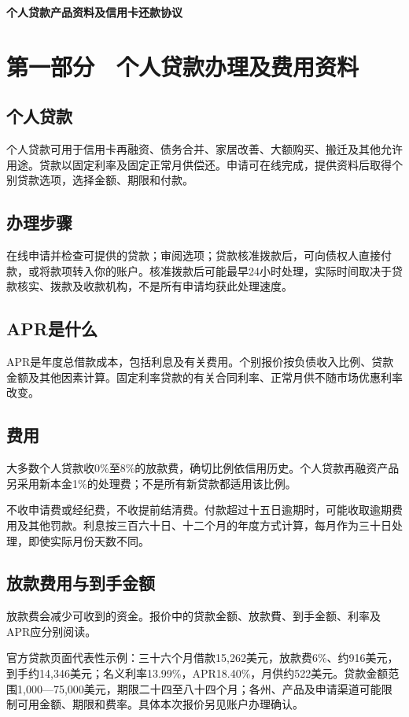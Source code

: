 \documentclass[UTF8,fontset=none,11pt,a4paper]{ctexart}
\begin{document}
{\noindent\LARGE\bfseries 个人贷款产品资料及信用卡还款协议\par}
\vspace{10pt}
\section*{第一部分　个人贷款办理及费用资料}
\subsection*{个人贷款}
个人贷款可用于信用卡再融资、债务合并、家居改善、大额购买、搬迁及其他允许用途。贷款以固定利率及固定正常月供偿还。申请可在线完成，提供资料后取得个别贷款选项，选择金额、期限和付款。


\subsection*{办理步骤}
在线申请并检查可提供的贷款；审阅选项；贷款核准拨款后，可向债权人直接付款，或将款项转入你的账户。核准拨款后可能最早24小时处理，实际时间取决于贷款核实、拨款及收款机构，不是所有申请均获此处理速度。


\subsection*{APR是什么}
APR是年度总借款成本，包括利息及有关费用。个别报价按负债收入比例、贷款金额及其他因素计算。固定利率贷款的有关合同利率、正常月供不随市场优惠利率改变。


\subsection*{费用}
大多数个人贷款收0\%至8\%的放款费，确切比例依信用历史。个人贷款再融资产品另采用新本金1\%的处理费；不是所有新贷款都适用该比例。


不收申请费或经纪费，不收提前结清费。付款超过十五日逾期时，可能收取逾期费用及其他罚款。利息按三百六十日、十二个月的年度方式计算，每月作为三十日处理，即使实际月份天数不同。


\subsection*{放款费用与到手金额}
放款费会减少可收到的资金。报价中的贷款金额、放款費、到手金额、利率及APR应分别阅读。


官方贷款页面代表性示例：三十六个月借款15,262美元，放款费6\%、约916美元，到手约14,346美元；名义利率13.99\%，APR18.40\%，月供约522美元。贷款金额范围1,000—75,000美元，期限二十四至八十四个月；各州、产品及申请渠道可能限制可用金额、期限和费率。具体本次报价另见账户办理确认。
\end{document}
